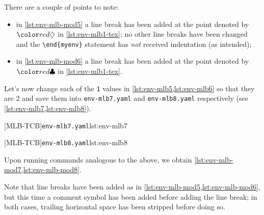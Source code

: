 There are a couple of points to note:
\begin{itemize}
  \item in \cref{lst:env-mlb-mod5} a line break has been added at the point denoted by $\EndStartsOnOwnLine$ in \vref{lst:env-mlb1-tex}; no 
    other line breaks have been changed and the \lstinline!\end{myenv}! statement has \emph{not} received indentation (as intended);
  \item in \cref{lst:env-mlb-mod6} a line break has been added at the point denoted by $\EndFinishesWithLineBreak$ in \vref{lst:env-mlb1-tex}. 
\end{itemize}

Let's now change each of the \texttt{1} values in \cref{lst:env-mlb5,lst:env-mlb6} so that they are $2$ and 
save them into \texttt{env-mlb7.yaml} and \texttt{env-mlb8.yaml} respectively (see \cref{lst:env-mlb7,lst:env-mlb8}).

\begin{minipage}{.49\textwidth}
[MLB-TCB]{\texttt{env-mlb7.yaml}}{lst:env-mlb7}
\end{minipage}
\hfill
\begin{minipage}{.49\textwidth}
[MLB-TCB]{\texttt{env-mlb8.yaml}}{lst:env-mlb8}
\end{minipage}

Upon running  commands analogous to the above, we obtain \cref{lst:env-mlb-mod7,lst:env-mlb-mod8}.

\begin{sidebyside}
\begin{minipage}{.42\linewidth}
\end{minipage}
\hfill
\begin{minipage}{.57\linewidth}
\end{minipage}
\end{sidebyside}

Note that line breaks have been added as in \cref{lst:env-mlb-mod5,lst:env-mlb-mod6}, but this time a comment symbol
has been added before adding the line break; in both cases, trailing horizontal 
space has been stripped before doing so.

